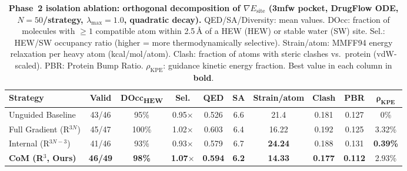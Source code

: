 \documentclass{article}
\begin{document}
\begin{table}[H]
  \centering
  \caption{\textbf{Phase~2 isolation ablation: orthogonal decomposition of
    $\nabla E_{\text{site}}$ (3mfw pocket, DrugFlow ODE, $N=50$/strategy,
    $\lambda_{\max}=1.0$, quadratic decay).}
    QED/SA/Diversity: mean values.  DOcc: fraction of molecules with $\ge 1$
    compatible atom within 2.5\,\AA{} of a HEW (HEW) or stable water (SW) site.
    Sel.: HEW/SW occupancy ratio (higher = more thermodynamically selective).
    Strain/atom: MMFF94 energy relaxation per heavy atom (kcal/mol/atom).
    Clash: fraction of atoms with steric clashes vs.\ protein (vdW-scaled).
    PBR: Protein Bump Ratio.  $\rho_{\text{KPE}}$: guidance kinetic energy
    fraction.  Best value in each column in \textbf{bold}.}
  \label{tab:ablation_decomp}
  \small
  \begin{tabular}{l c c c c c c c c c}
    \toprule
    \textbf{Strategy} & \textbf{Valid} & \textbf{DOcc\textsubscript{HEW}}
    & \textbf{Sel.} & \textbf{QED} & \textbf{SA} & \textbf{Strain/atom}
    & \textbf{Clash} & \textbf{PBR} & $\bm{\rho_{\text{KPE}}}$ \\
    \midrule
    Unguided Baseline       & 43/46 & 95\%  & 0.95$\times$ & 0.526 & 6.6 & 21.4  & 0.181 & 0.127 & 0\% \\
    \midrule
    Full Gradient (R$^{3N}$) & 45/47 & 100\% & 1.02$\times$ & 0.603 & 6.4 & 16.22 & 0.192 & 0.125 & 3.32\% \\
    Internal (R$^{3N-3}$)    & 41/46 & 93\%  & 0.93$\times$ & 0.579 & 6.7 & \textbf{24.24} & 0.188 & 0.131 & \textbf{0.39\%} \\
    \textbf{CoM (R$^3$, Ours)} & \textbf{46/49} & \textbf{98\%} & \textbf{1.07$\times$} & \textbf{0.594} & \textbf{6.2} & \textbf{14.33} & \textbf{0.177} & \textbf{0.112} & 2.93\% \\
    \bottomrule
  \end{tabular}
\end{table}
\end{document}
